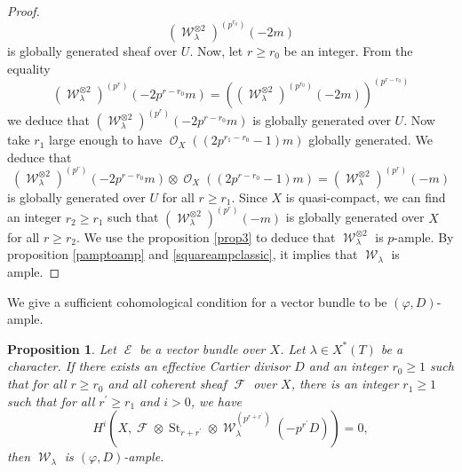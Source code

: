 \documentclass[11pt]{amsart}
\numberwithin{subsection}{section}
\numberwithin{figure}{section}
\numberwithin{table}{section}
\theoremstyle{1}
\newtheorem{proposition}[theorem]{Proposition}
\theoremstyle{2}
\DeclareMathOperator{\St}{St}
\DeclareMathOperator{\Fc}{\mathcal{F}}
\DeclareMathOperator{\E}{\mathcal{E}}
\DeclareMathOperator{\Oc}{\mathcal{O}}
\DeclareMathOperator{\W}{\mathcal{W}}
\begin{document}
\begin{proof}
\begin{equation*}
{(\W_{\lambda}^{\otimes 2})}^{(p^{r_0})}(-2m)
\end{equation*}
is globally generated sheaf over $U$. Now, let $r \geq r_0$ be an integer. From the equality
\begin{equation*}
{(\W_{\lambda}^{\otimes 2})}^{(p^r)}(-2p^{r-r_0}m) = {\left({(\W_{\lambda}^{\otimes 2})}^{(p^{r_0})}(-2m)\right)}^{(p^{r-r_0})}
\end{equation*} 
we deduce that ${(\W_{\lambda}^{\otimes 2})}^{(p^r)}(-2p^{r-r_0}m)$ is globally generated over $U$. Now take $r_1$ large enough to have $\Oc_X((2p^{r_1-r_0}-1)m)$ globally generated. We deduce that
\begin{equation*}
{(\W_{\lambda}^{\otimes 2})}^{(p^r)}(-2p^{r-r_0}m) \otimes \Oc_X((2p^{r-r_0}-1)m) = {(\W_{\lambda}^{\otimes 2})}^{(p^{r})}(-m)
\end{equation*}
is globally generated over $U$ for all $r \geq r_1$. Since $X$ is quasi-compact, we can find an integer $r_2 \geq r_1$ such that ${(\W_{\lambda}^{\otimes 2})}^{(p^{r})}(-m)$ is globally generated over $X$ for all $r\geq r_2$. We use the proposition \ref{prop3} to deduce that ${\W_{\lambda}^{\otimes 2}}$ is $p$-ample. By proposition \ref{pamptoamp} and \ref{squareampclassic}, it implies that $\W_{\lambda}$ is ample.
\end{proof}
We give a sufficient cohomological condition for a vector bundle to be $(\varphi,D)$-ample. 
\begin{proposition}\label{technicalD}
Let $\E$ be a vector bundle over $X$. Let $\lambda \in X^*(T)$ be a character. If there exists an effective Cartier divisor $D$ and an integer $r_ 0 \geq 1$ such that for all $r \geq r_0$ and all coherent sheaf $\Fc$ over $X$, there is an integer $r_1 \geq 1$ such that for all $r^\prime \geq r_1$ and $i>0$, we have
\begin{equation*}
H^i(X,\Fc \otimes \St_{r+r^\prime} \otimes \W_{\lambda}^{(p^{r+r^\prime})}(-p^{r^\prime}D)) = 0,
\end{equation*}
then $\W_{\lambda}$ is $(\varphi,D)$-ample.
\end{proposition}
\end{document}
